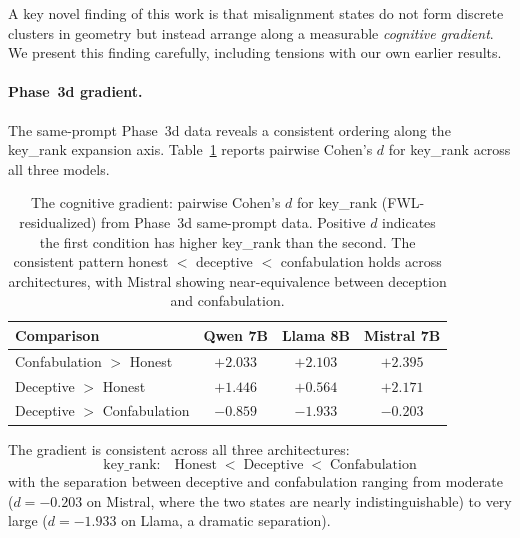 A key novel finding of this work is that misalignment states do not form discrete clusters in \kvcache geometry but instead arrange along a measurable \emph{cognitive gradient}.
We present this finding carefully, including tensions with our own earlier results.

\paragraph{Phase~3d gradient.}
The same-prompt Phase~3d data reveals a consistent ordering along the key\_rank expansion axis.
Table~\ref{tab:gradient} reports pairwise Cohen's $d$ for key\_rank across all three models.

\begin{table}[t]
  \centering
  \caption{The cognitive gradient: pairwise Cohen's $d$ for key\_rank (FWL-residualized) from Phase~3d same-prompt data.
  Positive $d$ indicates the first condition has higher key\_rank than the second.
  The consistent pattern honest $<$ deceptive $<$ confabulation holds across architectures, with Mistral showing near-equivalence between deception and confabulation.}
  \label{tab:gradient}
  \begin{tabular}{@{}lccc@{}}
    \toprule
    Comparison & Qwen 7B & Llama 8B & Mistral 7B \\
    \midrule
    Confabulation $>$ Honest   & $+2.033$ & $+2.103$ & $+2.395$ \\
    Deceptive $>$ Honest       & $+1.446$ & $+0.564$ & $+2.171$ \\
    Deceptive $>$ Confabulation & $-0.859$ & $-1.933$ & $-0.203$ \\
    \bottomrule
  \end{tabular}
\end{table}

The gradient is consistent across all three architectures:
\begin{equation}
  \text{key\_rank:} \quad \text{Honest} \;<\; \text{Deceptive} \;<\; \text{Confabulation}
  \label{eq:gradient}
\end{equation}
with the separation between deceptive and confabulation ranging from moderate ($d = -0.203$ on Mistral, where the two states are nearly indistinguishable) to very large ($d = -1.933$ on Llama, a dramatic separation).

